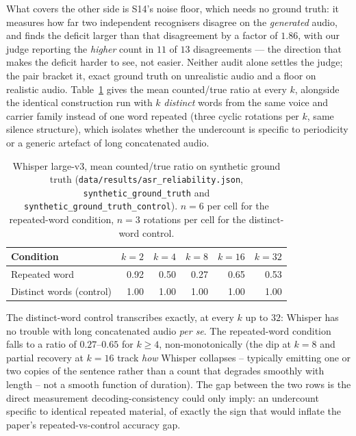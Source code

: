 \documentclass[11pt]{article}
\begin{document}
What covers the other side is S14's noise floor, which needs no ground truth: it
measures how far two independent recognisers disagree on the \emph{generated}
audio, and finds the deficit larger than that disagreement by a factor of
$1.86$, with our judge reporting the \emph{higher} count in $11$ of $13$
disagreements --- the direction that makes the deficit harder to see, not
easier. Neither audit alone settles the judge; the pair bracket it, exact
ground truth on unrealistic audio and a floor on realistic audio.
Table~\ref{tab:asraudit-b} gives the mean counted/true ratio at every $k$,
alongside the identical construction run with $k$ \emph{distinct} words from
the same voice and carrier family instead of one word repeated (three cyclic
rotations per $k$, same silence structure), which isolates whether the
undercount is specific to periodicity or a generic artefact of long
concatenated audio.

\begin{table}[h]
\centering
\caption{Whisper large-v3, mean counted/true ratio on synthetic ground truth
(\texttt{data/results/asr\_reliability.json}, \texttt{synthetic\_ground\_truth}
and \texttt{synthetic\_ground\_truth\_control}). $n{=}6$ per cell for the
repeated-word condition, $n{=}3$ rotations per cell for the distinct-word
control.}
\label{tab:asraudit-b}
\small
\begin{tabular}{@{}lrrrrr@{}}
\toprule
Condition & $k{=}2$ & $k{=}4$ & $k{=}8$ & $k{=}16$ & $k{=}32$ \\
\midrule
Repeated word & 0.92 & 0.50 & 0.27 & 0.65 & 0.53 \\
Distinct words (control) & 1.00 & 1.00 & 1.00 & 1.00 & 1.00 \\
\bottomrule
\end{tabular}
\end{table}

The distinct-word control transcribes exactly, at every $k$ up to $32$:
Whisper has no trouble with long concatenated audio \emph{per se}. The
repeated-word condition falls to a ratio of $0.27$--$0.65$ for $k\ge4$,
non-monotonically (the dip at $k{=}8$ and partial recovery at $k{=}16$ track
\emph{how} Whisper collapses -- typically emitting one or two copies of the
sentence rather than a count that degrades smoothly with length -- not a
smooth function of duration). The gap between the two rows is the direct
measurement decoding-consistency could only imply: an undercount specific to
identical repeated material, of exactly the sign that would inflate the
paper's repeated-vs-control accuracy gap.
\end{document}
